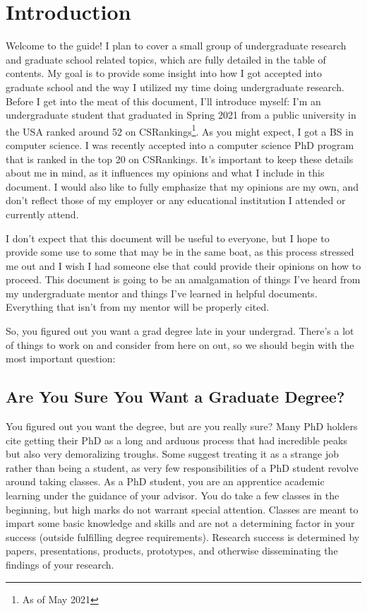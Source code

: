 \documentclass[12pt]{article}
\begin{document}


\tableofcontents
\pagebreak

\section{Introduction}

Welcome to the guide! I plan to cover a small group of undergraduate research and graduate school related topics, which are fully detailed in the table of contents. My goal is to provide some insight into how I got accepted into graduate school and the way I utilized my time doing undergraduate research. Before I get into the meat of this document, I’ll introduce myself: I’m an undergraduate student that graduated in Spring 2021 from a public university in the USA ranked around 52 on CSRankings\footnote{As of May 2021}. As you might expect, I got a BS in computer science. I was recently accepted into a computer science PhD program that is ranked in the top 20 on CSRankings. It’s important to keep these details about me in mind, as it influences my opinions and what I include in this document. I would also like to fully emphasize that my opinions are my own, and don’t reflect those of my employer or any educational institution I attended or currently attend. 

I don’t expect that this document will be useful to everyone, but I hope to provide some use to some that may be in the same boat, as this process stressed me out and I wish I had someone else that could provide their opinions on how to proceed. This document is going to be an amalgamation of things I've heard from my undergraduate mentor and things I've learned in helpful documents. Everything that isn't from my mentor will be properly cited.

So, you figured out you want a grad degree late in your undergrad. There’s a lot of things to work on and consider from here on out, so we should begin with the most important question:

\subsection{Are You Sure You Want a Graduate Degree?}

You figured out you want the degree, but are you really sure? Many PhD holders cite getting their PhD as a long and arduous process that had incredible peaks but also very demoralizing troughs. Some suggest treating it as a strange job rather than being a student, as very few responsibilities of a PhD student revolve around taking classes. \cite{AzumaPhD} As a PhD student, you are an apprentice academic learning under the guidance of your advisor. You do take a few classes in the beginning, but high marks do not warrant special attention. Classes are meant to impart some basic knowledge and skills and are not a determining factor in your success (outside fulfilling degree requirements). Research success is determined by papers, presentations, products, prototypes, and otherwise disseminating the findings of your research.
\end{document}
